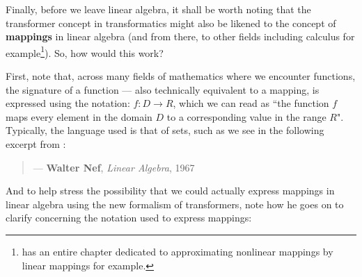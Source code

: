 \documentclass[a4paper, 18pt]{book} %
\begin{document}
\begin{appendices}
\vspace{2em}

Finally, before we leave linear algebra, it shall be worth noting that the transformer concept in transformatics might also be likened to the concept of \textbf{mappings} in linear algebra (and from there, to other fields including calculus for example\footnote{\cite{fitzpatrick1995advanced} has an entire chapter dedicated to approximating nonlinear mappings by linear mappings for example.}). So, how would this work?

\vspace{2em}


First, note that, across many fields of mathematics where we encounter functions, the signature of a function --- also technically equivalent to a mapping, is expressed using the notation: $f : D \rightarrow R$, which we can read as ``the function $f$ maps every element in the domain $D$ to a corresponding value in the range $R$". Typically, the language used is that of sets, such as we see in the following excerpt from \cite{nef1967linear}:


\vspace{2em}

\noindent
\begin{minipage}{1\textwidth}
\vspace{1em}
\begin{quotation}
\hspace*{\fill} --- \textbf{Walter Nef}, \textit{Linear Algebra}, 1967\cite{nef1967linear}
\end{quotation}
\vspace{1em}
\end{minipage}

\vspace{2em}


And to help stress the possibility that we could actually express mappings in linear algebra using the new formalism of transformers, note how he goes on to clarify concerning the notation used to express mappings:




\end{appendices}
\end{document}

